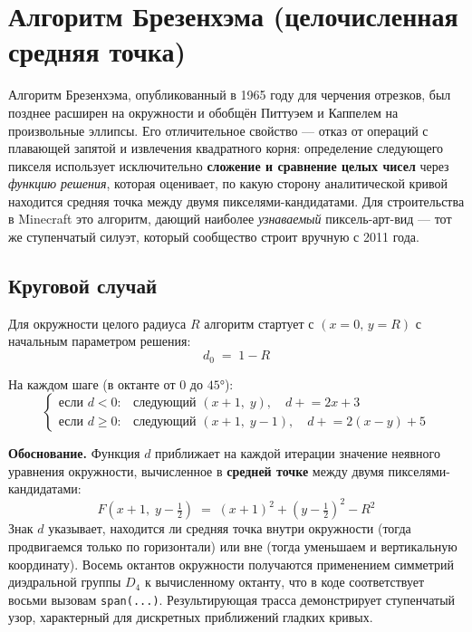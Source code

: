\documentclass[12pt,a4paper]{scrartcl}
\newcommand{\code}[1]{\texttt{\small #1}}
\newcommand{\acc}[1]{\textcolor{accent}{\textbf{#1}}}
\begin{document}
\section{Алгоритм Брезенхэма (целочисленная средняя точка)}

Алгоритм Брезенхэма, опубликованный в 1965 году для черчения отрезков, был позднее расширен на окружности и обобщён Питтуэем и Каппелем на произвольные эллипсы. Его отличительное свойство — отказ от операций с плавающей запятой и извлечения квадратного корня: определение следующего пикселя использует исключительно \acc{сложение и сравнение целых чисел} через \emph{функцию решения}, которая оценивает, по какую сторону аналитической кривой находится средняя точка между двумя пикселями-кандидатами. Для строительства в Minecraft это алгоритм, дающий наиболее \emph{узнаваемый} пиксель-арт-вид — тот же ступенчатый силуэт, который сообщество строит вручную с 2011 года.

\subsection{Круговой случай}

Для окружности целого радиуса $R$ алгоритм стартует с $(x{=}0,\,y{=}R)$ с начальным параметром решения:
\[
d_0 \;=\; 1 - R
\]

На каждом шаге (в октанте от $0$ до $45°$):
\[
\begin{cases}
\text{если } d < 0: & \text{следующий } (x{+}1,\;y), \quad d \mathrel{+}= 2x+3 \\[2pt]
\text{если } d \geq 0: & \text{следующий } (x{+}1,\;y{-}1), \quad d \mathrel{+}= 2(x-y)+5
\end{cases}
\]

\textbf{Обоснование.} Функция $d$ приближает на каждой итерации значение неявного уравнения окружности, вычисленное в \acc{средней точке} между двумя пикселями-кандидатами:
\[
F\!\left(x+1,\;y-\tfrac{1}{2}\right) \;=\; (x+1)^2 + \left(y-\tfrac{1}{2}\right)^{\!2} - R^2
\]
Знак $d$ указывает, находится ли средняя точка внутри окружности (тогда продвигаемся только по горизонтали) или вне (тогда уменьшаем и вертикальную координату). Восемь октантов окружности получаются применением симметрий диэдральной группы $D_4$ к вычисленному октанту, что в коде соответствует восьми вызовам \code{span(...)}. Результирующая трасса демонстрирует ступенчатый узор, характерный для дискретных приближений гладких кривых.
\end{document}
